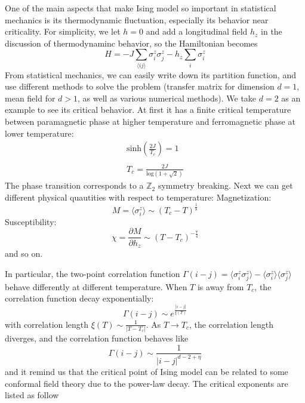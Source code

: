 \documentclass[12pt]{article}
\begin{document}
One of the main aspects that make Ising model so important in statistical mechanics is its thermodynamic fluctuation, especially its behavior near criticality. For simplicity, we let $h=0$ and add a longitudinal field $h_z$ in the  discussion of thermodynaminc behavior, so the Hamiltonian becomes
\begin{equation}
		H=-J\sum_{\langle ij\rangle}\sigma^z_i\sigma^z_j-h_z\sum_i\sigma_i^z
\end{equation}
From statistical mechanics, we can easily write down its partition function, and use different methods to solve the problem (transfer matrix for dimension $d=1$, mean field for $d>1$, as well as various numerical methods). We take $d=2$ as an example to see its critical behavior. At first it has a finite critical temperature between paramagnetic phase at higher temperature and ferromagnetic phase at lower temperature:
\begin{equation}
\begin{align}
	\mathrm{sinh}\left(\frac{2J}{T_c}\right)=1\\
	\\
	T_c=\frac{2J}{\mathrm{log}(1+\sqrt{2})}
\end{align} 
\end{equation}
The phase transition corresponds to a $\mathbb{Z}_2$ symmetry breaking. Next we can get different physical quautities with respect to temperature:
Magnetization:
\begin{equation}
	M=\langle\sigma_i^z\rangle\sim(T_c-T)^{\frac{1}{8}}
\end{equation}
Susceptibility:
\begin{equation}
	\chi=\frac{\partial M}{\partial h_z}\sim(T-T_c)^{-\frac{7}{4}}
\end{equation}
and so on. 

In particular, the two-point correlation function $\Gamma(i-j)=\langle\sigma_i^z\sigma_j^z\rangle-\langle\sigma_i^z\rangle\langle\sigma_j^z\rangle$ behave differently at different temperature. When $T$ is away from $T_c$, the correlation function decay exponentially:
\begin{equation}
	\Gamma(i-j)\sim e^{\frac{|i-j|}{\xi(T)}}
\end{equation}
with correlation length $\xi(T)\sim\frac{1}{|T-T_c|}$. As $T\rightarrow T_c$, the correlation length diverges, and the correlation function behaves like
\begin{equation}
	\Gamma(i-j)\sim\frac{1}{|i-j|^{d-2+\eta}}
\end{equation}
and it remind us that the critical point of Ising model can be related to some conformal field theory due to the power-law decay. The critical exponents are listed as follow
\end{document}
